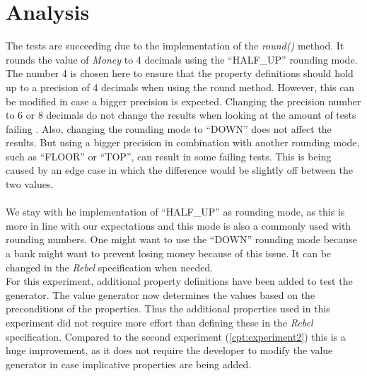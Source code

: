 \section{Analysis}
The tests are succeeding due to the implementation of the \textit{round()} method. It rounds the value of \textit{Money} to 4 decimals using the ``HALF\_UP'' rounding mode. The number 4 is chosen here to ensure that the property definitions should hold up to a precision of 4 decimals when using the round method. However, this can be modified in case a bigger precision is expected. Changing the precision number to 6 or 8 decimals do not change the results when looking at the amount of tests failing . Also, changing the rounding mode to ``DOWN'' does not affect the results. But using a bigger precision in combination with another rounding mode, such as ``FLOOR'' or ``TOP'', can result in some failing tests. This is being caused by an edge case in which the difference would be slightly off between the two values.\\
\\
We stay with he implementation of ``HALF\_UP'' as rounding mode, as this is more in line with our expectations and this mode is also a commonly used with rounding numbers. One might want to use the ``DOWN'' rounding mode because a bank might want to prevent losing money because of this issue. It can be changed in the \textit{Rebel} specification when needed.
\\
For this experiment, additional property definitions have been added to test the generator. The value generator now determines the values based on the preconditions of the properties. Thus the additional properties used in this experiment did not require more effort than defining these in the \textit{Rebel} specification. Compared to the second experiment (\autoref{cpt:experiment2}) this is a huge improvement, as it does not require the developer to modify the value generator in case implicative properties are being added.

